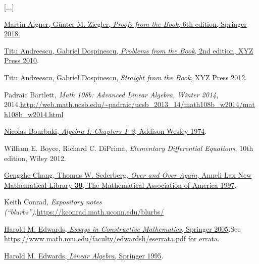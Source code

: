 \documentclass[numbers=enddot,12pt,final,onecolumn,notitlepage]{scrartcl}%
\numberwithin{exer}{subsection}
\theoremstyle{definition}
\begin{document}
[...]

\newpage

\begin{thebibliography}{99999999}                                                                                         %


%
\href{https://doi.org/10.1007/978-3-662-57265-8}{Martin Aigner, G\"{u}nter M.
Ziegler, \textit{Proofs from the Book}, 6th edition, Springer 2018.}

\href{https://bookstore.ams.org/xyz-13}{Titu
Andreescu, Gabriel Dospinescu, \textit{Problems from the Book}, 2nd edition,
XYZ Press 2010}.

\href{https://bookstore.ams.org/xyz-6}{Titu
Andreescu, Gabriel Dospinescu, \textit{Straight from the Book}, XYZ Press
2012}.

Padraic Bartlett, \textit{Math 108b: Advanced
Linear Algebra, Winter 2014}, 2014.\newline\url{http://web.math.ucsb.edu/~padraic/ucsb_2013_14/math108b_w2014/math108b_w2014.html}

%
\href{http://libgen.rs/book/index.php?md5=3270565F6D0052635A1550883588204C}{Nicolas
Bourbaki, \textit{Algebra I: Chapters 1--3}, Addison-Wesley 1974}.

William E. Boyce, Richard C. DiPrima,
\textit{Elementary Differential Equations}, 10th edition, Wiley 2012.

%
\href{https://www.jstor.org/stable/10.4169/j.ctt19b9mbq}{Gengzhe Chang, Thomas
W. Sederberg, \textit{Over and Over Again}, Anneli Lax New Mathematical
Library \textbf{39}, The Mathematical Association of America 1997}.

Keith Conrad, \textit{Expository notes
(\textquotedblleft blurbs\textquotedblright)}.\newline\url{https://kconrad.math.uconn.edu/blurbs/}

%
\href{https://doi.org/10.1007/b138656}{Harold M. Edwards, \textit{Essays in
Constructive Mathematics}, Springer 2005}.\newline See
\url{https://www.math.nyu.edu/faculty/edwardsh/eserrata.pdf} for errata.

%
\href{https://doi.org/10.1007/978-0-8176-4446-8}{Harold M. Edwards,
\textit{Linear Algebra}, Springer 1995}.


\end{thebibliography}
\end{document}
